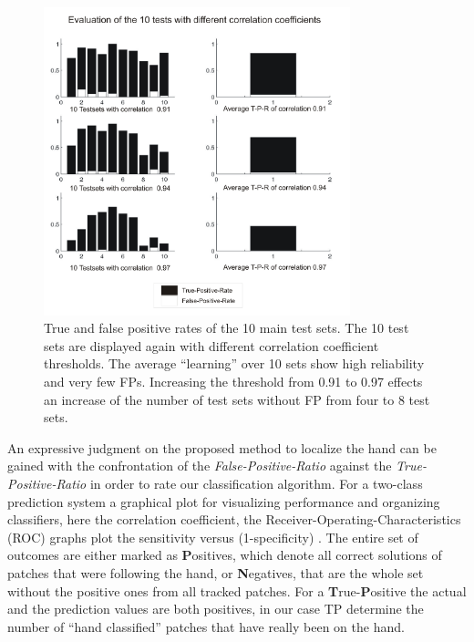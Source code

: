 %
\begin{figure}
	\begin{center}
		\includegraphics[width=3.5in]{imgs/results/diag.pdf}
			\caption[True and false positive rates of the 10 main test sets. ]{True and false positive rates of the 10 main test sets. The 10 test sets are displayed again with different correlation coefficient thresholds. The average ``learning'' over 10 sets show high reliability and very few FPs. Increasing the threshold from 0.91 to 0.97 effects an increase of the number of test sets without FP from four to 8 test sets.}
			\label{fig:result:diag}
	\end{center}
\end{figure}
%
%
An expressive judgment on the proposed method to localize the hand can be gained with the confrontation of the \textit{False-Positive-Ratio} against the \textit{True-Positive-Ratio} in order to rate our classification algorithm. For a two-class prediction system a graphical plot for visualizing performance and organizing classifiers, here the correlation coefficient, the Receiver-Operating-Characteristics (ROC) graphs plot the sensitivity versus (1-specificity) \cite{ROC04-03}. The entire set of outcomes are either marked as \textbf{P}ositives, which denote all correct solutions of patches that were following the hand, or \textbf{N}egatives, that are the whole set without the positive ones from all tracked patches. %
For a \textbf{T}rue-\textbf{P}ositive the actual and the prediction values are both positives, in our case TP determine the number of ``hand classified'' patches that have really been on the hand. %
